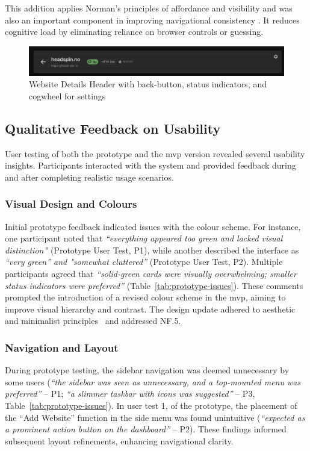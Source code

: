 This addition applies Norman's principles of affordance and visibility and was also an important component in improving navigational consistency \parencite{sharp-2019}. It reduces cognitive load by eliminating reliance on browser controls or guessing.

\begin{figure}[H]
    \centering
    \includegraphics[width=1\linewidth]{figures/header_websiteDetails.png}
    \caption{Website Details Header with back-button, status indicators, and cogwheel for settings}
    \label{fig:header_websitedetails}
\end{figure}


\subsection{Qualitative Feedback on Usability}
User testing of both the prototype and the \acrshort{mvp} version revealed several usability insights. Participants interacted with the system and provided feedback during and after completing realistic usage scenarios.

\subsubsection{Visual Design and Colours}
Initial prototype feedback indicated issues with the colour scheme. For instance, one participant noted that \textit{“everything appeared too green and lacked visual distinction”} (Prototype User Test, P1), while another described the interface as \textit{“very green” and "somewhat cluttered”} (Prototype User Test, P2). Multiple participants agreed that \textit{“solid-green cards were visually overwhelming; smaller status indicators were preferred”} (Table~\ref{tab:prototype-issues}). These comments prompted the introduction of a revised colour scheme in the \acrshort{mvp}, aiming to improve visual hierarchy and contrast. The design update adhered to aesthetic and minimalist principles~\autocite{Nielsen1994} and addressed NF.5.

\subsubsection{Navigation and Layout}
During prototype testing, the sidebar navigation was deemed unnecessary by some users (\textit{“the sidebar was seen as unnecessary, and a top-mounted menu was preferred”} – P1; \textit{“a slimmer taskbar with icons was suggested”} – P3, Table~\ref{tab:prototype-issues}). In user test 1, of the prototype, the placement of the “Add Website” function in the side menu was found unintuitive (\textit{“expected as a prominent action button on the dashboard”} – P2). These findings informed subsequent layout refinements, enhancing navigational clarity.


